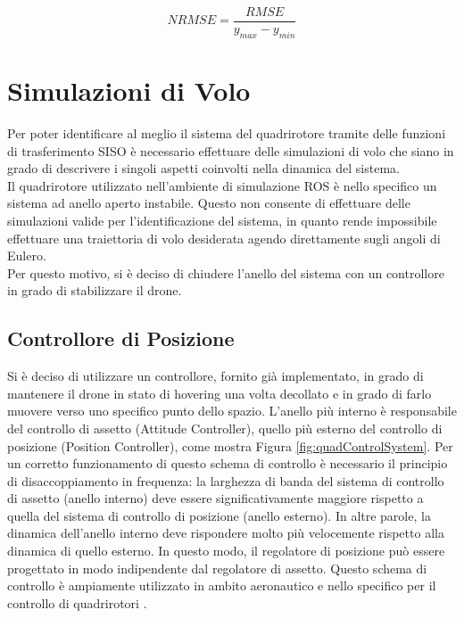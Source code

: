 \begin{equation}
	NRMSE = \frac{RMSE}{y_{max} - y_{min}}
	\label{nrmse}
\end{equation}


\section{Simulazioni di Volo}
Per poter identificare al meglio il sistema del quadrirotore tramite delle funzioni di trasferimento \acs{SISO} è necessario effettuare delle simulazioni di volo che siano in grado di descrivere i singoli aspetti coinvolti nella dinamica del sistema.\\

 Il quadrirotore utilizzato nell'ambiente di simulazione \acs{ROS} è nello specifico un sistema ad anello aperto instabile. Questo non consente di effettuare delle simulazioni valide per l'identificazione del sistema, in quanto rende impossibile effettuare una traiettoria di volo desiderata agendo direttamente sugli angoli di Eulero.\\
 
 Per questo motivo, si è deciso di chiudere l'anello del sistema con un controllore in grado di stabilizzare il drone.

\subsection{Controllore di Posizione}
Si è deciso di utilizzare un controllore, fornito già implementato, in grado di mantenere il drone in stato di hovering una volta decollato e in grado di farlo muovere verso uno specifico punto dello spazio. L'anello più interno è responsabile del controllo di assetto (Attitude Controller), quello più esterno del controllo di posizione (Position Controller), come mostra Figura \ref{fig:quadControlSystem}. Per un corretto funzionamento di questo schema di controllo è necessario il principio di disaccoppiamento in frequenza: la larghezza di banda del sistema di controllo di assetto (anello interno) deve essere significativamente maggiore rispetto a quella del sistema di controllo di posizione (anello esterno). In altre parole, la dinamica dell’anello interno deve rispondere molto più velocemente rispetto alla dinamica di quello esterno. In questo modo, il regolatore di posizione può essere progettato in modo indipendente dal regolatore di assetto. Questo schema di controllo è ampiamente utilizzato in ambito aeronautico e nello specifico per il controllo di quadrirotori \cite{modelloQuad1} \cite{modelloQuad2} \cite{modelloQuad3} \cite{idEsempio} \cite{controlQuad} \cite{controlloQuad2}.

